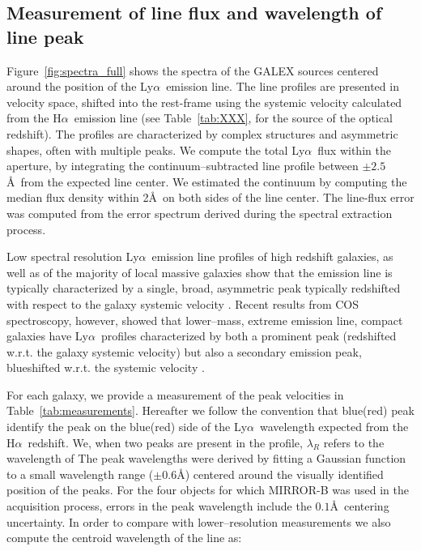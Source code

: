 \documentclass[manuscript]{emulateapj}
\newcommand{\lya}{Ly$\alpha$}
\newcommand{\ha}{H$\alpha$}
\begin{document}
\subsection{Measurement of line flux and wavelength of line peak}\label{sect:peakmeas}
Figure~\ref{fig:spectra_full} shows the spectra of the GALEX sources centered around the position of the \lya\  emission line. 
The line profiles are presented in velocity space, shifted into the rest-frame using the systemic velocity calculated from 
the \ha\ emission line (see Table~\ref{tab:XXX}, for the source of the optical redshift).
The profiles are characterized by complex structures and asymmetric shapes, often with multiple peaks. 
We compute the total \lya\ flux within the aperture, by  integrating the continuum--subtracted line profile between 
$\pm 2.5$\AA\ from the expected line center. We estimated the continuum by computing the median flux density
within 2\AA\ on both sides of the line center. The line-flux error was
computed from the error spectrum derived during the spectral extraction process.  

Low spectral resolution \lya\ emission line profiles of high redshift galaxies, as well as of the majority of 
local massive galaxies show that the emission line is typically characterized by a single, broad, asymmetric peak typically 
redshifted with respect to  the galaxy systemic velocity  \citep{REF,REF}. Recent results from COS spectroscopy, however, 
showed that lower--mass, extreme emission line,  compact galaxies have \lya\  profiles characterized by both a prominent peak (redshifted w.r.t. the galaxy systemic velocity) but also a secondary emission peak, blueshifted w.r.t. the systemic velocity \citep{henry2015,jaskott201X}.

For each galaxy, we provide a measurement of the peak velocities in Table~\ref{tab:measurements}.  
 Hereafter we  follow the convention that blue(red) peak  identify the peak on the blue(red) side
of the \lya\ wavelength expected from the \ha\ redshift. We, when two peaks are present in the profile, $\lambda_R$ refers to the wavelength of 
The peak wavelengths were derived by fitting a Gaussian function to a small wavelength range ($\pm 0.6$\AA) 
centered around the visually identified position of the peaks. For the four objects for which MIRROR-B was used in 
the acquisition process, errors in the peak wavelength include the $0.1$\AA\ centering uncertainty. 
In order to compare with lower--resolution measurements we also compute the centroid wavelength of the line as:
\end{document}
